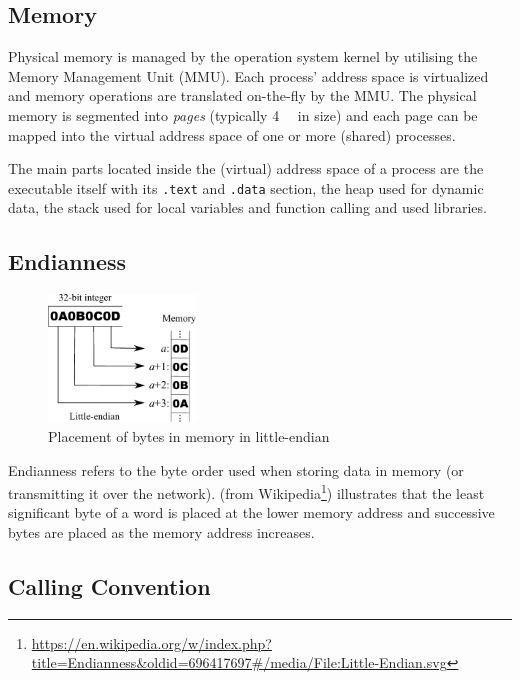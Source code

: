 \documentclass[article]{uibk}
\begin{document}
\subsection{Memory}

Physical memory is managed by the operation system kernel by utilising the
Memory Management Unit (MMU). Each process' address space is virtualized and
memory operations are translated on-the-fly by the MMU. The physical memory is
segmented into \textit{pages} (typically \SI{4}{\kibi\byte} in size) and each
page can be mapped into the virtual address space of one or more (shared)
processes.~\cite[pp.~400]{unix_interals}

The main parts located inside the (virtual) address space of a process are the
executable itself with its \texttt{.text} and \texttt{.data} section, the heap
used for dynamic data, the stack used for local variables and function calling
and used libraries.

\subsection{Endianness}

\begin{figure}[t]
    \centering
    \includegraphics[width=0.35\textwidth]{gfx/little_endian.pdf}
    \caption{Placement of bytes in memory in little-endian}
    \label{fig:little_endian}
\end{figure}

Endianness refers to the byte order used when storing data in memory (or
transmitting it over the network).  (from
Wikipedia\footnote{\url{https://en.wikipedia.org/w/index.php?title=Endianness&oldid=696417697\#/media/File:Little-Endian.svg}})
illustrates that the least significant byte of a word is placed at the lower
memory address and successive bytes are placed as the memory address increases.

\subsection{Calling Convention}
\end{document}
